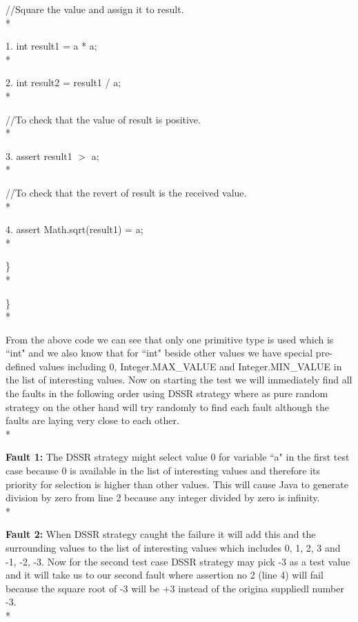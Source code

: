 //Square the value and assign it to result.\\*

1.\hspace{12mm} int result1 = a * a;\\*

2. \hspace{12mm}int result2 = result1 / a;\\*

//To check that the value of result is positive.\\*

3.\hspace{12mm} assert result1 $>$ a;\\*

//To check that the revert of result is the received value.\\*

4. \hspace{12mm}assert Math.sqrt(result1) = a;\\*



\hspace{7mm}\}  \\*

\}\\*

\hspace{10 mm}From the above code we can see that only one primitive type is used which is ``int" and we also know that for ``int" beside other values we have special pre-defined values including 0, Integer.MAX\_VALUE and Integer.MIN\_VALUE in the list of interesting values. Now on starting the test we will immediately find all the faults in the following order using DSSR strategy where as pure random strategy on the other hand will try randomly to find each fault although the faults are laying very close to each other.\\*



\textbf{Fault 1:} The DSSR strategy might select value 0 for variable ``a"  in the first test case because 0 is available in the list of interesting values and therefore its priority for selection is higher than other values. This will cause Java to generate division by zero from line 2 because any integer divided by zero is infinity.\\*

\textbf{Fault 2:} When DSSR strategy caught the failure it will add this and the surrounding values to the list of interesting values which includes 0, 1, 2, 3 and -1, -2, -3. Now for the second test case DSSR strategy may pick -3 as a test value and it will take us to our second fault where assertion no 2 (line 4) will fail because the square root of -3 will be +3 instead of the origina suppliedl number -3.\\*

